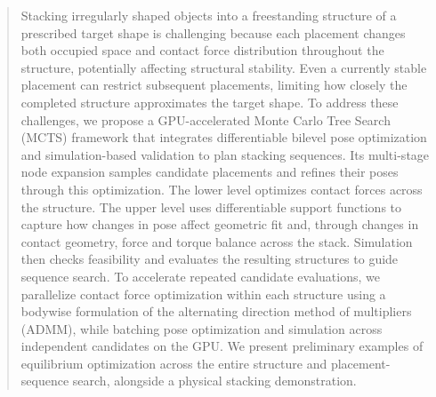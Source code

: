 \documentclass[conference]{IEEEtran}
\begin{document}
\begin{abstract}
Stacking irregularly shaped objects into a freestanding structure of a prescribed target shape is challenging because each placement changes both occupied space and contact force distribution throughout the structure, potentially affecting structural stability. Even a currently stable placement can restrict subsequent placements, limiting how closely the completed structure approximates the target shape.
To address these challenges, we propose a GPU-accelerated Monte Carlo Tree Search (MCTS) framework that integrates differentiable bilevel pose optimization and simulation-based validation to plan stacking sequences.
Its multi-stage node expansion samples candidate placements and refines their poses through this optimization.
The lower level optimizes contact forces across the structure. The upper level uses differentiable support functions to capture how changes in pose affect geometric fit and, through changes in contact geometry, force and torque balance across the stack.
Simulation then checks feasibility and evaluates the resulting structures to guide sequence search.
To accelerate repeated candidate evaluations, we parallelize contact force optimization within each structure using a bodywise formulation of the alternating direction method of multipliers (ADMM), while batching pose optimization and simulation across independent candidates on the GPU.
We present preliminary examples of equilibrium optimization across the entire structure and placement-sequence search, alongside a physical stacking demonstration.
\end{abstract}

\IEEEpeerreviewmaketitle
 




% 
% 
% 
\clearpage


\end{document}
